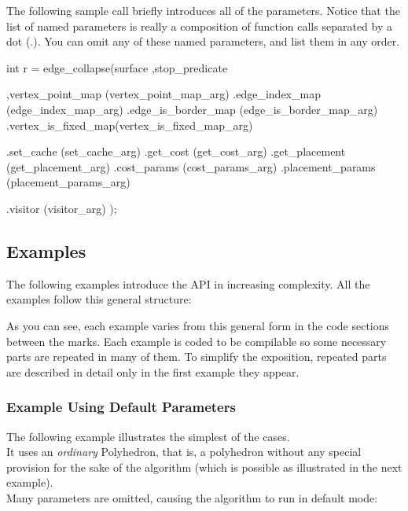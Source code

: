 The following sample call briefly introduces all of the parameters.
Notice that the list of named parameters is really a composition
of function calls separated by a dot ($.$). You can omit any of these named parameters, 
and list them in any order.

\begin{cprog}
int r = edge_collapse(surface
                     ,stop_predicate
                     
                     ,vertex_point_map   (vertex_point_map_arg)
                     .edge_index_map     (edge_index_map_arg)
                     .edge_is_border_map (edge_is_border_map_arg)
                     .vertex_is_fixed_map(vertex_is_fixed_map_arg)
                     
                     .set_cache          (set_cache_arg)
                     .get_cost           (get_cost_arg)
                     .get_placement      (get_placement_arg)
                     .cost_params        (cost_params_arg)
                     .placement_params   (placement_params_arg)
                     
                     .visitor            (visitor_arg)
                     );
\end{cprog}

\subsection{Examples}

The following examples introduce the API in increasing complexity. All the examples follow 
this general structure:


As you can see, each example varies from this general form in the code sections between 
the marks. Each example is coded to be compilable so some necessary parts are repeated 
in many of them. To simplify the exposition, repeated parts are described in detail 
only in the first example they appear.

\subsubsection{Example Using Default Parameters}

The following example illustrates the simplest of the cases.\\
It uses an {\em ordinary} Polyhedron, that is, a polyhedron without any special provision 
for the sake of the algorithm (which is possible as illustrated in the next example).\\
Many parameters are omitted, causing the algorithm to run in default mode:

